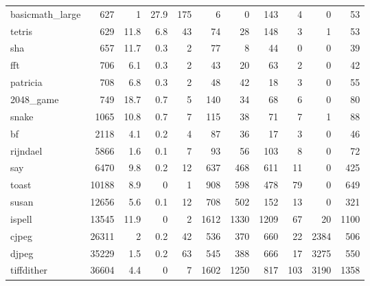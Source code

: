 \begin{tabular}{lrrrrrrrrrr}
 basicmath\_large &            627 &      1   &   27.9 &  175 &      6 &          0 &          143 &     4 &     0 &    53 \\
 tetris          &            629 &     11.8 &    6.8 &   43 &     74 &         28 &          148 &     3 &     1 &    53 \\
 sha             &            657 &     11.7 &    0.3 &    2 &     77 &          8 &           44 &     0 &     0 &    39 \\
 fft             &            706 &      6.1 &    0.3 &    2 &     43 &         20 &           63 &     2 &     0 &    42 \\
 patricia        &            708 &      6.8 &    0.3 &    2 &     48 &         42 &           18 &     3 &     0 &    55 \\
 2048\_game       &            749 &     18.7 &    0.7 &    5 &    140 &         34 &           68 &     6 &     0 &    80 \\
 snake           &           1065 &     10.8 &    0.7 &    7 &    115 &         38 &           71 &     7 &     1 &    88 \\
 bf              &           2118 &      4.1 &    0.2 &    4 &     87 &         36 &           17 &     3 &     0 &    46 \\
 rijndael        &           5866 &      1.6 &    0.1 &    7 &     93 &         56 &          103 &     8 &     0 &    72 \\
 say             &           6470 &      9.8 &    0.2 &   12 &    637 &        468 &          611 &    11 &     0 &   425 \\
 toast           &          10188 &      8.9 &    0   &    1 &    908 &        598 &          478 &    79 &     0 &   649 \\
 susan           &          12656 &      5.6 &    0.1 &   12 &    708 &        502 &          152 &    13 &     0 &   321 \\
 ispell          &          13545 &     11.9 &    0   &    2 &   1612 &       1330 &         1209 &    67 &    20 &  1100 \\
 cjpeg           &          26311 &      2   &    0.2 &   42 &    536 &        370 &          660 &    22 &  2384 &   506 \\
 djpeg           &          35229 &      1.5 &    0.2 &   63 &    545 &        388 &          666 &    17 &  3275 &   550 \\
 tiffdither      &          36604 &      4.4 &    0   &    7 &   1602 &       1250 &          817 &   103 &  3190 &  1358 \\

\end{tabular}
